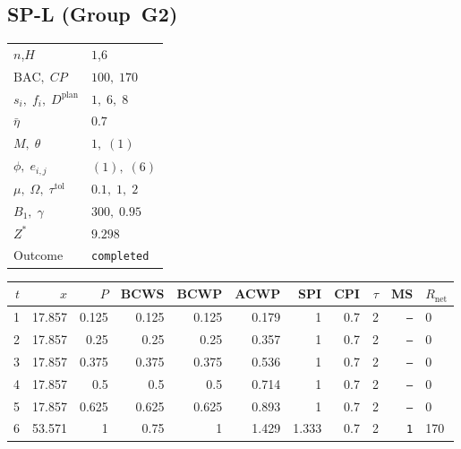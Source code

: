 \documentclass[12pt, a4paper]{article}
\newcommand{\BAC}{\mathrm{BAC}}
\begin{document}
\newpage

\subsection*{SP-L  (Group~G2)}
\begin{center}
\begin{tabular}{ll}
\toprule
$n$,\;$H$ & $1$,\;$6$ \\
$\BAC,\;CP$ & $100,\;170$ \\
$s_i,\;f_i,\;D^{\mathrm{plan}}$ & $1,\;6,\;8$ \\
$\bar\eta$ & $0.7$ \\
$M,\;\theta$ & $1,\;(1)$ \\
$\phi,\;e_{i,j}$ & $(1),\;(6)$ \\
$\mu,\;\Omega,\;\tau^{\mathrm{tol}}$ & $0.1,\;1,\;2$ \\
$B_1,\;\gamma$ & $300,\;0.95$ \\
$Z^*$ & $9.298$ \\
Outcome & \texttt{completed} \\
\bottomrule
\end{tabular}
\end{center}

\begin{center}
\begin{tabular}{rrrrrrrrrrl}
\toprule
$t$ & $x$ & $P$ & BCWS & BCWP & ACWP & SPI & CPI & $\tau$ & MS & $R_{\mathrm{net}}$\\
\midrule
1 & 17.857 & 0.125 & 0.125 & 0.125 & 0.179 & 1 & 0.7 & 2 & \texttt{---} & 0 \\
2 & 17.857 & 0.25 & 0.25 & 0.25 & 0.357 & 1 & 0.7 & 2 & \texttt{---} & 0 \\
3 & 17.857 & 0.375 & 0.375 & 0.375 & 0.536 & 1 & 0.7 & 2 & \texttt{---} & 0 \\
4 & 17.857 & 0.5 & 0.5 & 0.5 & 0.714 & 1 & 0.7 & 2 & \texttt{---} & 0 \\
5 & 17.857 & 0.625 & 0.625 & 0.625 & 0.893 & 1 & 0.7 & 2 & \texttt{---} & 0 \\
6 & 53.571 & 1 & 0.75 & 1 & 1.429 & 1.333 & 0.7 & 2 & \texttt{1} & 170 \\
\bottomrule
\end{tabular}
\end{center}
\end{document}
